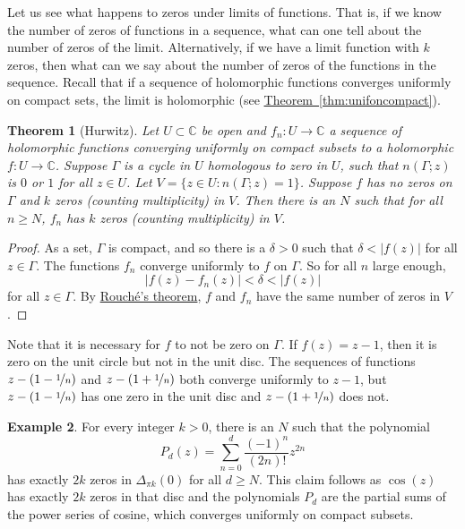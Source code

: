 \documentclass[12pt,openany]{book}
\newcommand{\sabs}[1]{\lvert {#1} \rvert}
\newcommand{\C}{{\mathbb{C}}}
\theoremstyle{plain}
\newtheorem{thm}{Theorem}[section]
\theoremstyle{remark}
\theoremstyle{definition}
\theoremstyle{exercise}
\theoremstyle{example}
\newtheorem{example}[thm]{Example}
\newcommand{\thmref}[1]{\hyperref[#1]{Theorem~\ref*{#1}}}
\begin{document}
Let us see what happens to zeros under limits of functions.
That is, if we know the number of zeros of functions in a sequence,
what can one tell about the number of zeros of the limit.  Alternatively,
if we have a limit function with $k$ zeros, then what can
we say about the number of zeros of the functions in the sequence.
Recall that if a sequence of holomorphic
functions converges uniformly on compact sets, the limit is holomorphic
(see \thmref{thm:unifoncompact}).

\begin{thm}[Hurwitz]
Let $U \subset \C$ be open and $f_n \colon U \to \C$ a sequence of
holomorphic functions converging uniformly on compact subsets
to a holomorphic $f \colon U \to \C$.  Suppose $\Gamma$ is
a cycle in $U$ homologous to zero in $U$,
such that $n(\Gamma;z)$ is $0$ or $1$ for all $z \in U$.
Let $V = \bigl\{ z \in U : n(\Gamma;z) = 1 \bigr\}$.
Suppose $f$ has no zeros on $\Gamma$ and $k$ zeros (counting
multiplicity) in $V$.
Then there is an $N$ such that for all $n \geq N$,
$f_n$ has $k$ zeros (counting multiplicity) in $V$.
\end{thm}

\begin{proof}
As a set, $\Gamma$ is compact, and so
there is a $\delta > 0$ such that $\delta < \sabs{f(z)}$
for all $z \in \Gamma$.
The functions $f_n$
converge uniformly to $f$ on $\Gamma$.
So for all $n$ large enough,
\begin{equation*}
\sabs{f(z)-f_n(z)} < \delta < \sabs{f(z)}
\end{equation*}
for all $z \in \Gamma$.  By \hyperref[thm:rouche2]{Rouch\'e's theorem},
$f$ and $f_n$ have the same number of zeros in $V$.
\end{proof}

Note that it is necessary for $f$
to not be zero on $\Gamma$.  If $f(z) = z-1$, then it is zero on
the unit circle but not in the unit disc.
The sequences of functions $z-(1-\nicefrac{1}{n})$ and 
$z-(1+\nicefrac{1}{n})$ both converge uniformly to $z-1$, but
$z-(1-\nicefrac{1}{n})$ has one zero in the unit disc
and $z-(1+\nicefrac{1}{n})$ does not.

\begin{example}
For every integer $k > 0$, there is an $N$ such that
the polynomial
\begin{equation*}
P_d(z) = \sum_{n=0}^d \frac{{(-1)}^n}{(2n)!}z^{2n}
\end{equation*}
has exactly $2k$ zeros in $\Delta_{\pi k}(0)$ for all $d \geq N$.
This claim follows as $\cos(z)$ has exactly $2k$ zeros in that disc
and the polynomials $P_d$ are the partial sums of the power series of
cosine, which converges uniformly on compact subsets.
\end{example}
  
\end{document}

